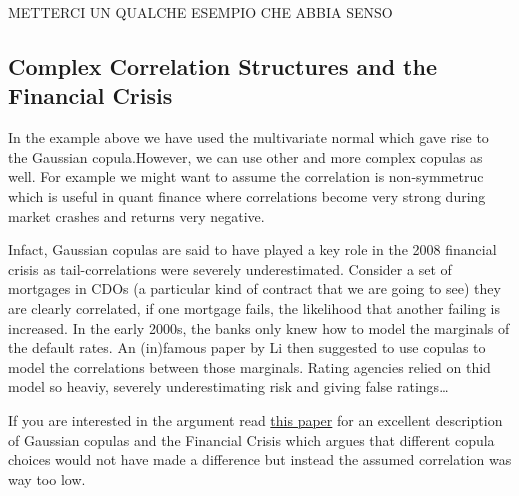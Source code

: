 METTERCI UN QUALCHE ESEMPIO CHE ABBIA SENSO 

\subsection{Complex Correlation Structures and the Financial
Crisis}\label{complex-correlation-structures-and-the-financial-crisis}

In the example above we have used the multivariate normal which gave
rise to the Gaussian copula.However, we can use other and more complex
copulas as well. For example we might want to assume the correlation is
non-symmetruc which is useful in quant finance where correlations become
very strong during market crashes and returns very negative.

Infact, Gaussian copulas are said to have played a key role in the 2008
financial crisis as tail-correlations were severely underestimated.
Consider a set of mortgages in CDOs (a particular kind of contract that
we are going to see) they are clearly correlated, if one mortgage fails,
the likelihood that another failing is increased. In the early 2000s,
the banks only knew how to model the marginals of the default rates. An
(in)famous paper by Li then suggested to use copulas to model the
correlations between those marginals. Rating agencies relied on thid
model so heaviy, severely underestimating risk and giving false
ratings\ldots{}

If you are interested in the argument read
\href{http://samueldwatts.com/wp-content/uploads/2016/08/Watts-Gaussian-Copula_Financial_Crisis.pdf}{this paper}
for an excellent description of Gaussian copulas and the Financial
Crisis which argues that different copula choices would not have made a
difference but instead the assumed correlation was way too low.
